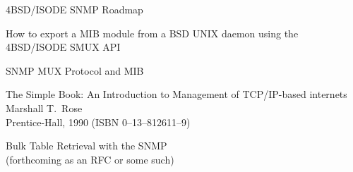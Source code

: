 \begin{bwslide}

\begin{nrtc}
\item	4BSD/ISODE SNMP Roadmap

\item	How to export a MIB module from a BSD UNIX daemon using the
	4BSD/ISODE SMUX API

\item	SNMP MUX Protocol and MIB

\item	The Simple Book: An Introduction to Management of TCP/IP-based
	internets\\
	Marshall T.~Rose\\
	Prentice-Hall, 1990 (ISBN 0--13--812611--9)

\item	Bulk Table Retrieval with the SNMP\\
	(forthcoming as an RFC or some such)
\end{nrtc}
\end{bwslide}
